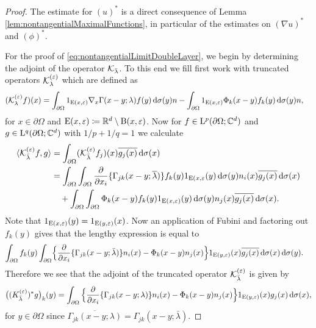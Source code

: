 \begin{proof}
  The estimate for $(u)^*$ is a direct consequence of Lemma \ref{lem:nontangentialMaximalFunctions}, in particular of the estimates on $(\nabla u)^*$ and $(\phi)^*$.

  For the proof of \eqref{eq:nontangentialLimitDoubleLayer}, we begin by determining the adjoint of the operator $\mathcal{K}_{\bar\lambda}$.
  To this end we fill first work with truncated operators $\mathcal{K}_{\lambda}^{(\varepsilon)}$ which are defined as
  \begin{align*}
    (\mathcal{K}_\lambda^{(\varepsilon)} f) (x)
    &= \int_{\partial\Omega} 1_{\mathrm{E}(x,\varepsilon)} \nabla_x \Gamma(x - y; \lambda)  f(y) \, {\operatorname{d}\!{\sigma}}(y) n - \int_{\partial\Omega} 1_{\mathrm{E}(x,\varepsilon)} \Phi_k(x - y) f_k(y) \, {\operatorname{d}\!{\sigma}}(y) n,
  \end{align*}
  for $x \in \partial\Omega$ and $\mathrm{E}(x,\varepsilon) \coloneqq \mathbb{R}^d \setminus \mathrm{B}(x,\varepsilon)$.
  Now for $f \in \mathrm{L}^p(\partial\Omega; \mathbb{C}^d)$ and $g \in \mathrm{L}^q(\partial\Omega; \mathbb{C}^d)$ with $1/p + 1/q = 1$ we calculate
  \begin{align*}
    \langle \mathcal{K}_{\bar\lambda}^{(\varepsilon)}f, g \rangle
    &= \int_{\partial\Omega} (\mathcal{K}_{\bar\lambda}^{(\varepsilon)} f_j)(x) \overline{g_j(x)} \, {\operatorname{d}\!{\sigma}}(x) \\
    &= \int_{\partial\Omega} \int_{\partial\Omega} \frac{\partial}{\partial x_i} \{ \Gamma_{jk} (x - y; \overline\lambda) \} f_k(y) 1_{\mathrm{E}(x,\varepsilon}(y) \, {\operatorname{d}\!{\sigma}}(y) n_i(x) \overline{g_j(x)} \, {\operatorname{d}\!{\sigma}}(x) \\
    &\quad+ \int_{\partial\Omega} \int_{\partial\Omega} \Phi_k(x -y)f_k(y) 1_{\mathrm{E}(x,\varepsilon)}(y) \, {\operatorname{d}\!{\sigma}}(y) n_j(x) \overline{g_j(x)} \, {\operatorname{d}\!{\sigma}}(x).
  \end{align*}
  Note that $1_{\mathrm{E}(x,\varepsilon)}(y) = 1_{\mathrm{E}(y,\varepsilon)}(x)$.
  Now an application of Fubini and factoring out $f_k(y)$ gives that the lengthy expression is equal to
  \begin{align*}
    \int_{\partial\Omega} f_k(y) \int_{\partial\Omega} &\Big\{ \frac{\partial}{\partial x_i} \{ \Gamma_{jk}(x - y; \bar\lambda)\} n_i(x)
    - \Phi_k(x - y)  n_j(x) \Big\}1_{\mathrm{E}(y, \varepsilon)}(x) \overline{g_j(x)} \, {\operatorname{d}\!{\sigma}}(x) \, {\operatorname{d}\!{\sigma}}(y).
  \end{align*}
  Therefore we see that the adjoint of the truncated operator $\mathcal{K}_{\bar\lambda}^{(\varepsilon)}$ is given by
  \begin{align*}
    \big( ( K_{\bar\lambda}^{(\varepsilon)})^* g\big)_k(y)
    = \int_{\partial\Omega} \Big\{ \frac{\partial}{\partial x_i} \{ \Gamma_{jk}(x - y; \lambda)\} n_i(x) - \Phi_k(x - y) n_j(x) \Big\} 1_{\mathrm{E}(y,\varepsilon)}(x) g_j(x) \, {\operatorname{d}\!{\sigma}}(x), 
  \end{align*}
  for $y \in \partial\Omega$ since $\overline{\Gamma_{jk}(x - y; \lambda)} = \Gamma_{jk}(x - y; \bar\lambda)$.


\end{proof}
